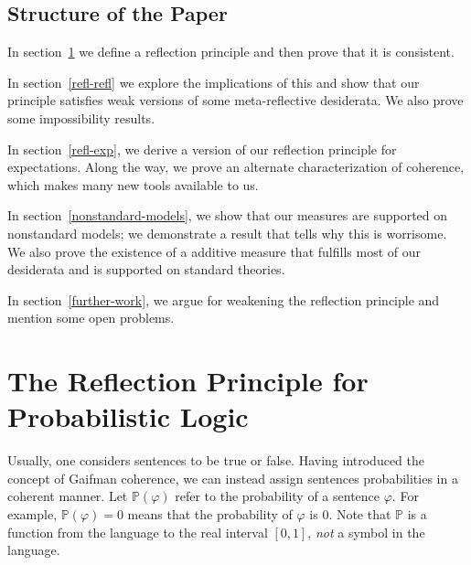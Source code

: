 \documentclass[12pt]{article}
\newcommand{\PP}{\mathbb{P}}
\newcommand{\vp}{\varphi}
\theoremstyle{plain}
\theoremstyle{definition}
\theoremstyle{remark}
\begin{document}
\subsection{Structure of the Paper} %
In section~\ref{refl-cons} we define a reflection principle and then prove that it is consistent. 

In section~\ref{refl-refl} we explore the implications of this and show that our principle satisfies weak versions of some meta-reflective desiderata. We also prove some impossibility results.

In section~\ref{refl-exp}, we derive a version of our reflection principle for expectations. Along the way, we prove an alternate characterization of coherence, which makes many new tools available to us. 

In section~\ref{nonstandard-models}, we show that our measures are supported on nonstandard models; we demonstrate a result that tells why this is worrisome. We also prove the existence of a additive measure that fulfills most of our desiderata and is supported on standard theories. 

In section~\ref{further-work}, we argue for weakening the reflection principle and mention some open problems. %

\section{The Reflection Principle for Probabilistic Logic}
\label{refl-cons}




Usually, one considers sentences to be true or false. Having introduced the concept of Gaifman coherence, we can instead assign sentences probabilities in a coherent manner. Let $\PP(\vp)$ refer to the probability of a sentence $\vp$. For example, $\PP(\vp)=0$ means that the probability of $\vp$ is $0$. Note that $\PP$ is a function from the language to the real interval $[0,1]$, \emph{not} a symbol in the language.
\end{document}
